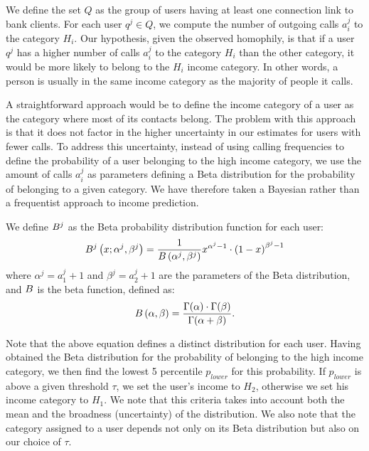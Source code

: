 We define the set $Q$ as the group of users having at least one connection link to bank clients. For each user $q^j \in Q$, we compute the number of outgoing calls $a^j_i$ to the category $H_i$. Our hypothesis, given the observed homophily, is that if a user $q^j$ has a higher number of calls $a^j_i$ to the category $H_i$ than the other category, it would be more likely to belong to the $H_i$ income category. In other words, a person is usually in the same income category as the majority of people it calls.

A straightforward approach would be to define the income category of a user as the category where most of its contacts belong. The problem with this approach is that it does not factor in the higher uncertainty in our estimates for users with fewer calls. To address this uncertainty, instead of using calling frequencies to define the probability of a user belonging to the high income category, we use the amount of calls $a^j_i$  as parameters defining a Beta distribution for the probability of belonging to a given category. We have therefore taken a Bayesian rather than a frequentist approach to income prediction.


We define \(B^j\) as the Beta probability distribution function for each user:
\begin{equation}
	B^j \left( x; \alpha^j, \beta^j \right) = \frac{1}{B \left( \alpha^j, \beta^j \right)} x^{\alpha^j - 1} \cdot {\left( 1 - x \right)}^{\beta^j - 1}
\label{Beta}
\end{equation}
where $\alpha^j = a^j_1 +1$ and $\beta^j = a^j_2 +1$ are the parameters of the Beta distribution,
and $B$ is the beta function, defined as:
\begin{equation}
B \left( \alpha, \beta \right) =
\frac{\Gamma \! \left( \alpha \right) \cdot \Gamma \! \left( \beta \right)}
{\Gamma \! \left( \alpha + \beta \right)} .
\label{Beta}
\end{equation}


Note that the above equation defines a distinct distribution for each user. Having obtained the Beta distribution for the probability of belonging to the high income category, we then find the lowest 5 percentile $p_{lower}$ for this probability. If $p_{lower}$ is above a given threshold $\tau$, we set the user's income to $H_2$, otherwise we set his income category to $H_1$. We note that this criteria takes into account both the mean and the broadness (uncertainty) of the distribution. We also note that the category assigned to a user depends not only on its Beta distribution but also on our choice of $\tau$.

